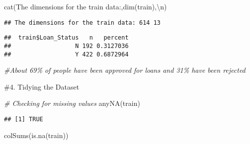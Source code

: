\documentclass[
]{article}
\newenvironment{Shaded}{\begin{snugshade}}{\end{snugshade}}
\newcommand{\CommentTok}[1]{\textcolor[rgb]{0.56,0.35,0.01}{\textit{#1}}}
\newcommand{\FunctionTok}[1]{\textcolor[rgb]{0.00,0.00,0.00}{#1}}
\newcommand{\NormalTok}[1]{#1}
\newcommand{\SpecialCharTok}[1]{\textcolor[rgb]{0.00,0.00,0.00}{#1}}
\newcommand{\StringTok}[1]{\textcolor[rgb]{0.31,0.60,0.02}{#1}}
\begin{document}
\begin{Shaded}
\begin{Highlighting}[]
\FunctionTok{cat}\NormalTok{(}\StringTok{\textquotesingle{}The dimensions for the train data:\textquotesingle{}}\NormalTok{,}\FunctionTok{dim}\NormalTok{(train),}\StringTok{\textquotesingle{}}\SpecialCharTok{\textbackslash{}n}\StringTok{\textquotesingle{}}\NormalTok{)}
\end{Highlighting}
\end{Shaded}

\begin{verbatim}
## The dimensions for the train data: 614 13
\end{verbatim}

\begin{Shaded}
\end{Shaded}

\begin{verbatim}
##  train$Loan_Status   n   percent
##                  N 192 0.3127036
##                  Y 422 0.6872964
\end{verbatim}

\begin{Shaded}
\begin{Highlighting}[]
\CommentTok{\#About 69\% of people have been approved for loans and 31\% have been rejected}
\end{Highlighting}
\end{Shaded}

\#4. Tidying the Dataset

\begin{Shaded}
\begin{Highlighting}[]
\CommentTok{\# Checking for missing values}
\FunctionTok{anyNA}\NormalTok{(train)}
\end{Highlighting}
\end{Shaded}

\begin{verbatim}
## [1] TRUE
\end{verbatim}

\begin{Shaded}
\begin{Highlighting}[]
\FunctionTok{colSums}\NormalTok{(}\FunctionTok{is.na}\NormalTok{(train))}
\end{Highlighting}
\end{Shaded}
\end{document}
